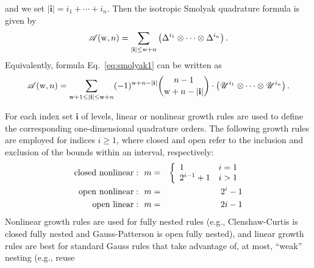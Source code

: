 and we set $|\mathbf{i}| = i_1+\cdots + i_n$.
Then the isotropic Smolyak quadrature formula is given by
%
\begin{equation}\label{eq:smolyak1}
\mathscr{A}({\rm w},n) = \sum_{|\mathbf{i}| \leq {\rm w}+n}\left(\Delta^{i_1}\otimes\cdots\otimes\Delta^{i_n}\right).
\end{equation}
%
Equivalently, formula Eq.~\ref{eq:smolyak1} can be written as~\cite{was_woz}
%
\begin{equation}\label{eq:smolyak2}
\mathscr{A}({\rm w},n) = \sum_{{\rm w}+1 \leq |\mathbf{i}| \leq {\rm w}+n}(-1)^{{\rm w}+n-|\mathbf{i}|}
{n-1 \choose {\rm w}+n-|\mathbf{i}|}\cdot
\left(\mathscr{U}^{i_1}\otimes\cdots\otimes\mathscr{U}^{i_n}\right).
\end{equation}

For each index set $\mathbf{i}$ of levels, linear or nonlinear growth
rules are used to define the corresponding one-dimensional quadrature
orders.  The following growth rules are employed for indices $i \geq
1$, where closed and open refer to the inclusion and exclusion of the
bounds within an interval, respectively:
\begin{eqnarray}
{\rm closed~nonlinear:}~~m &=& 
\left\{ \begin{array}{ll}
         1       & i=1 \\
         2^{i-1} + 1 & i > 1 
        \end{array} \right.    \label{eq:growth_CC_nonlin} \\
{\rm open~nonlinear:}~~m &=& 2^i - 1 \label{eq:growth_Gauss_nonlin} \\
{\rm open~linear:}   ~~m &=& 2 i - 1 \label{eq:growth_Gauss_lin}
\end{eqnarray}
Nonlinear growth rules are used for fully nested rules (e.g.,
Clenshaw-Curtis is closed fully nested and Gauss-Patterson is open
fully nested), and linear growth rules are best for standard Gauss
rules that take advantage of, at most, ``weak'' nesting (e.g., reuse
